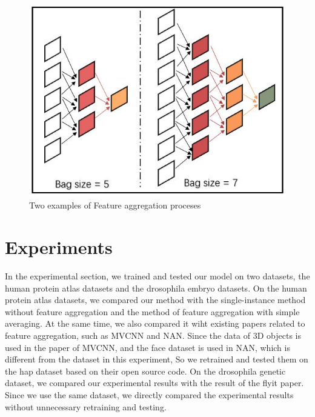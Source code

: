 \documentclass[10pt,twocolumn,letterpaper]{article}
\begin{document}
\begin{figure}[t]
\begin{center}
  \includegraphics[width=1.0\linewidth]{agg_process.JPG}
\end{center}
  \caption{Two examples of Feature aggregation proceses}
\label{fig:long}
\label{fig:onecol}
\end{figure}


\section{Experiments}
In the experimental section, we trained and tested our model on two datasets, the human protein atlas datasets and the drosophila embryo datasets. On the human protein atlas datasets, we compared our method with the single-instance method without feature aggregation and the method of feature aggregation with simple averaging. At the same time, we also compared it wiht existing papers related to feature aggregation, such as MVCNN and NAN. Since the data of 3D objects is used in the paper of MVCNN, and the face dataset is used in NAN, which is different from the dataset in this experiment, So we retrained and tested them on the hap dataset based on their open source code. On the drosophila genetic dataset, we compared our experimental results with the result of the flyit paper. Since we use the same dataset, we directly compared the experimental results without unnecessary retraining and testing.
\end{document}

